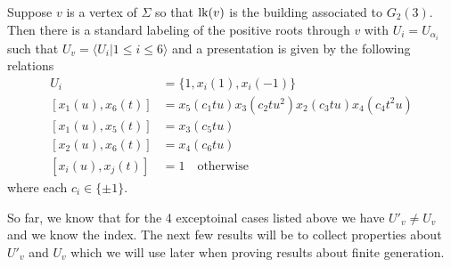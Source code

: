 \documentclass[class=book, crop=false,12 pt]{standalone}
\begin{document}
\begin{lemma}
	\label{lem:g23pres}
	Suppose $v$ is a vertex of $\Sigma$ so that $\mathrm{lk}(v)$ is the building associated to $G_2(3).$ Then there is a standard labeling of the positive roots through $v$ with $U_i=U_{\alpha_i}$ such that $U_v=\langle U_i|1\le i\le 6\rangle$ and a presentation is given by the following relations
	\begin{align*}
		U_i&=\{1,x_i(1),x_i(-1)\}\\
		[x_1(u),x_6(t)]&=x_5(c_1 tu)x_3(c_2 tu^2)x_2(c_3 tu)x_4(c_4 t^2u)\\
		[x_1(u),x_5(t)]&=x_3(c_5 tu)\\
		[x_2(u),x_6(t)]&=x_4(c_6 tu)\\
		[x_i(u),x_j(t)]&=1 \quad \text{otherwise}
	\end{align*}
where each $c_i\in \{\pm 1\}.$
\end{lemma}

So far, we know that for the 4 exceptoinal cases listed above we have $U'_v\neq U_v$ and we know the index. The next few results will be to collect properties about $U'_v$ and $U_v$ which we will use later when proving results about finite generation.
\end{document}
